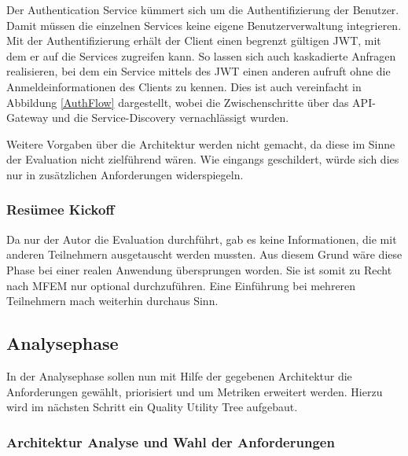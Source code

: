 
Der Authentication Service kümmert sich um die Authentifizierung der Benutzer. Damit müssen die einzelnen Services keine eigene Benutzerverwaltung integrieren. Mit der Authentifizierung erhält der Client einen begrenzt gültigen \ac{JWT}, mit dem er auf die Services zugreifen kann. So lassen sich auch kaskadierte Anfragen realisieren, bei dem ein Service mittels des \ac{JWT} einen anderen aufruft ohne die Anmeldeinformationen des Clients zu kennen. Dies ist auch vereinfacht in Abbildung \ref{AuthFlow} dargestellt, wobei die Zwischenschritte über das API-Gateway und die Service-Discovery vernachlässigt wurden.


Weitere Vorgaben über die Architektur werden nicht gemacht, da diese im Sinne der Evaluation nicht zielführend wären. Wie eingangs geschildert, würde sich dies nur in zusätzlichen Anforderungen widerspiegeln.

\subsubsection{Resümee Kickoff}

Da nur der Autor die Evaluation durchführt, gab es keine Informationen, die mit anderen Teilnehmern ausgetauscht werden mussten. Aus diesem Grund wäre diese Phase bei einer realen Anwendung übersprungen worden. Sie ist somit zu Recht nach \ac{MFEM} nur optional durchzuführen. Eine Einführung bei mehreren Teilnehmern mach weiterhin durchaus Sinn.

\subsection{Analysephase}

In der Analysephase sollen nun mit Hilfe der gegebenen Architektur die Anforderungen gewählt, priorisiert und um Metriken erweitert werden. Hierzu wird im nächsten Schritt ein Quality Utility Tree aufgebaut.

\subsubsection{Architektur Analyse und Wahl der Anforderungen}

